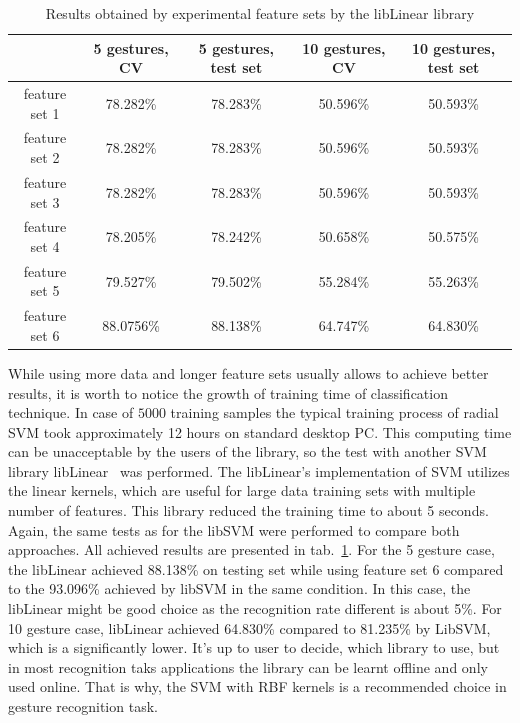 \begin{table}[htp!]
\begin{center}
	\label{staticfeatlin}
	\caption{Results obtained by experimental feature sets by the libLinear library}
    \begin{tabular}{|c|c|c|c|c|}
    \hline
    ~                                                   & 5 gestures, CV & 5 gestures, test set & 10 gestures, CV  & 10 gestures, test set \\ \hline
    feature set 1                     & 78.282\% & 78.283\%  & 50.596\% & 50.593\% \\ \hline
    feature set 2                     & 78.282\% & 78.283\%  & 50.596\% & 50.593\% \\ \hline
    feature set 3                     & 78.282\% & 78.283\%  & 50.596\% & 50.593\% \\ \hline
    feature set 4                     & 78.205\% & 78.242\%  & 50.658\% & 50.575\% \\ \hline
    feature set 5                     & 79.527\% & 79.502\%  & 55.284\% & 55.263\% \\ \hline
    feature set 6                     & 88.0756\% & 88.138\% & 64.747\% & 64.830\% \\ \hline
    \end{tabular}
    \end{center}
\end{table}

While using more data and longer feature sets usually allows to achieve better results, it is worth to notice the growth of training time of classification technique. 
In case of $5000$ training samples the typical training process of radial SVM took approximately 12 hours on standard desktop PC. 
This computing time can be unacceptable by the users of the library, so the test with another SVM library libLinear~\cite{libLinear} was performed. 
The libLinear's implementation of SVM utilizes the linear kernels, which are useful for large data training sets with multiple number of features. 
This library reduced the training time to about 5 seconds.
Again, the same tests as for the libSVM were performed to compare both approaches.
All achieved results are presented in tab.~\ref{staticfeatlin}.
For the 5 gesture case, the libLinear achieved 88.138\% on testing set while using feature set 6 compared to the 93.096\% achieved by libSVM in the same condition.
In this case, the libLinear might be good choice as the recognition rate different is about 5\%.
For 10 gesture case, libLinear achieved 64.830\% compared to 81.235\% by LibSVM, which is a significantly lower.
It's up to user to decide, which library to use, but in most recognition taks applications the library can be learnt offline and only used online.
That is why, the SVM with RBF kernels is a recommended choice in gesture recognition task.

